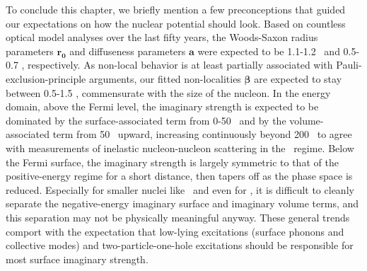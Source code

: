 To conclude this chapter, we briefly mention a few preconceptions
that guided our expectations on how the nuclear potential should look. Based on
countless optical model analyses over the last fifty years, the Woods-Saxon radius
parameters $\bm{r_{0}}$ and diffuseness parameters $\bm{a}$
were expected to be 1.1-1.2
\femto\meter\ and 0.5-0.7 \femto\meter, respectively. As non-local behavior is at
least partially associated with Pauli-exclusion-principle arguments, our fitted
non-localities $\bm{\beta}$
are expected to stay between 0.5-1.5 \femto\meter, commensurate with the size of the
nucleon. In the energy domain, above the Fermi level,
the imaginary strength is expected to be dominated by the surface-associated term from
0-50 \mega\electronvolt\ and by the volume-associated term from 50
\mega\electronvolt\ upward, increasing continuously beyond 200
\mega\electronvolt\ to agree with
measurements of inelastic nucleon-nucleon scattering in the \giga\electronvolt\ regime.
Below the Fermi surface, the imaginary strength is largely symmetric to that of the positive-energy
regime for a short distance, then tapers off as the phase space is reduced. Especially for smaller
nuclei like \oSix\ and even for \caForty, it is difficult to cleanly separate the negative-energy 
imaginary surface and imaginary volume terms, and this separation may not be physically
meaningful anyway. These general trends comport with the expectation
that low-lying excitations (surface phonons and collective modes) and
two-particle-one-hole excitations should be responsible for most surface imaginary strength.


